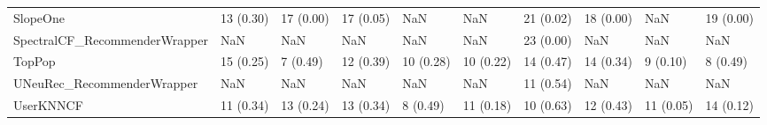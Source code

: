 \begin{tabular}{llllllllll}
                           SlopeOne &                13 (0.30) &   17 (0.00) &     17 (0.05) &          NaN &                  NaN &           21 (0.02) &         18 (0.00) &                NaN &         19 (0.00) \\
      SpectralCF\_RecommenderWrapper &                      NaN &         NaN &           NaN &          NaN &                  NaN &           23 (0.00) &               NaN &                NaN &               NaN \\
                             TopPop &                15 (0.25) &    7 (0.49) &     12 (0.39) &    10 (0.28) &            10 (0.22) &           14 (0.47) &         14 (0.34) &           9 (0.10) &          8 (0.49) \\
         UNeuRec\_RecommenderWrapper &                      NaN &         NaN &           NaN &          NaN &                  NaN &           11 (0.54) &               NaN &                NaN &               NaN \\
                          UserKNNCF &                11 (0.34) &   13 (0.24) &     13 (0.34) &     8 (0.49) &            11 (0.18) &           10 (0.63) &         12 (0.43) &          11 (0.05) &         14 (0.12) \\
\bottomrule
\end{tabular}
